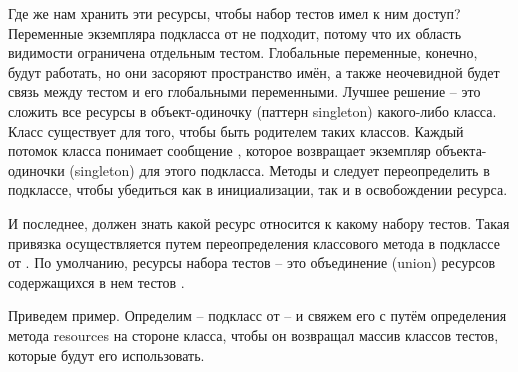 \documentclass[a4paper,10pt,twoside]{book}
\begin{document}
Где же нам хранить эти ресурсы, чтобы набор тестов имел к ним доступ?
Переменные экземпляра подкласса от  не подходит,
потому что их область видимости ограничена отдельным тестом.
Глобальные переменные, конечно, будут работать, но они засоряют пространство имён,
а также неочевидной будет связь между тестом и его глобальными переменными.
Лучшее решение – это сложить все ресурсы в объект-одиночку (паттерн singleton) какого-либо класса.
Класс  существует для того, чтобы быть родителем таких классов.
Каждый потомок класса  понимает сообщение ,
которое возвращает экземпляр объекта-одиночки (singleton) для этого подкласса.
Методы  и  следует переопределить в подклассе,
чтобы убедиться как в инициализации, так и в освобождении ресурса.

И последнее, \sunit должен знать какой ресурс относится к какому набору тестов.
Такая привязка осуществляется путем переопределения классового метода  в подклассе от .
По умолчанию, ресурсы набора тестов  – это объединение (union)
ресурсов содержащихся в нем тестов .

Приведем пример. Определим  – подкласс от  –
и свяжем его с  путём определения метода resources на стороне класса,
чтобы он возвращал массив классов тестов, которые будут его использовать.
\end{document}
